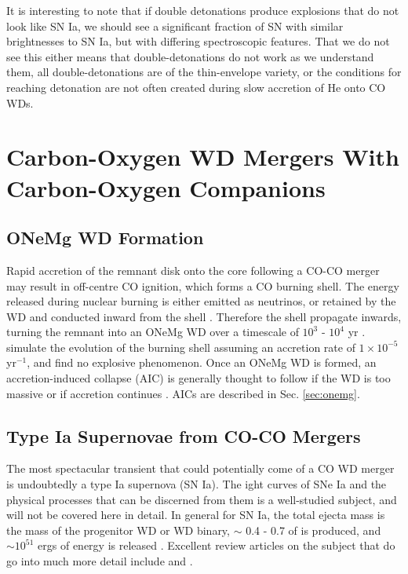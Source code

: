 It is interesting to note that if double detonations produce explosions that do not look like SN Ia, we should see a significant fraction of SN with similar brightnesses to SN Ia, but with differing spectroscopic features.  That we do not see this either means that double-detonations do not work as we understand them, all double-detonations are of the thin-envelope variety, or the conditions for reaching detonation are not often created during slow accretion of He onto CO WDs.

\section{Carbon-Oxygen WD Mergers With Carbon-Oxygen Companions}
\label{sec:withcarbon-oxygencompanions}

\subsection{ONeMg WD Formation}

Rapid accretion of the remnant disk onto the core following a CO-CO merger may result in off-centre CO ignition, which forms a CO burning shell.  The energy released during nuclear burning is either emitted as neutrinos, or retained by the WD and conducted inward from the shell \citep{saion98}.  Therefore the shell propagate inwards, turning the remnant into an ONeMg WD over a timescale of $10^{3}$ - $10^{4}$ yr \citep{yoonpr07,saion98}.  \citeauthor{saion98} simulate the evolution of the burning shell assuming an accretion rate of $1 \times 10^{-5}$ {\Msun} yr$^{-1}$, and find no explosive phenomenon.  Once an ONeMg WD is formed, an accretion-induced collapse (AIC) is generally thought to follow if the WD is too massive or if accretion continues \citep{yoonpr07,saion98}.  AICs are described in Sec. \ref{sec:onemg}.

\subsection{Type Ia Supernovae from CO-CO Mergers}

The most spectacular transient that could potentially come of a CO WD merger is undoubtedly a type Ia supernova (SN Ia).  The ight curves of SNe Ia and the physical processes that can be discerned from them is a well-studied subject, and will not be covered here in detail.  In general for SN Ia, the total ejecta mass is the mass of the progenitor WD or WD binary, $\sim$ 0.4 - 0.7 {\Msun} of {\Ni} is produced, and $\sim 10^{51}$ ergs of energy is released \citep{blin+06}.  Excellent review articles on the subject that do go into much more detail include \cite{howe10} and \cite{hilln00}.

